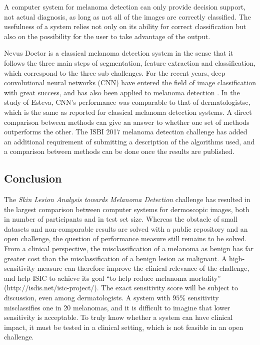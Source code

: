 \documentclass[a4paper,12pt]{article}
\begin{document}

A computer system for melanoma detection can only provide decision support, not actual diagnosis, as long as not all of the images are correctly classified. 
The usefulness of a system relies not only on its ability for correct classification but also on the possibility for the user to take advantage of the output. 

Nevus Doctor is a classical melanoma detection system in the sense that it follows the three main steps of segmentation, feature extraction and classification, which correspond to the three sub challenges.  
For the recent years, deep convolutional neural networks (CNN) have entered the field of image classification with great success, and has also been applied to melanoma detection \cite{Esteva2017Dermatologistlevel}. 
In the study of Esteva, CNN's performance was comparable to that of dermatologistse, which is the same as reported for classical melanoma detection systems.
A direct comparison between methods can give an answer to whether one set of methods outperforms the other. 
The ISBI 2017 melanoma detection challenge has added an additional requirement of submitting a description of the algorithms used, and a comparison between methods can be done once the results are published. 

\subsection{Conclusion}

The {\it Skin Lesion Analysis towards Melanoma Detection} challenge has resulted in the largest comparison between computer systems for dermoscopic images, both in number of participants and in test set size. 
Whereas the obstacle of small datasets and non-comparable results are solved with a public repository and an open challenge, the question of performance measure still remains to be solved. 
From a clinical perspective, the misclassification of a melanoma as benign has far greater cost than the misclassification of a benign lesion as malignant. 
A high-sensitivity measure can therefore improve the clinical relevance of the challenge, and help ISIC to achieve its goal ``to help reduce melanoma mortality'' (http://isdis.net/isic-project/). 
The exact sensitivity score will be subject to discussion, even among dermatologists. 
A system with $95\%$ sensitivity misclassifies one in 20 melanomas, and it is difficult to imagine that lower sensitivity is acceptable. 
To truly know whether a system can have clinical impact, it must be tested in a clinical setting, which is not feasible in an open challenge. 
\end{document}
